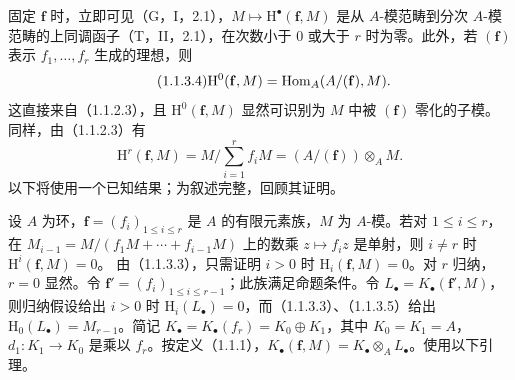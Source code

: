 固定 $\mathbf f$ 时，立即可见（G，I，2.1），$M\mapsto\mathrm H^\bullet(\mathbf f,M)$ 是从 $A$-模范畴到分次 $A$-模范畴的上同调函子（T，II，2.1），在次数小于 $0$ 或大于 $r$ 时为零。此外，若 $(\mathbf f)$ 表示 $f_1,\ldots,f_r$ 生成的理想，则
\begin{equation}\tag{1.1.3.4}
\mathrm H^0(\mathbf f,M)=\operatorname{Hom}_A(A/(\mathbf f),M).
\end{equation}
这直接来自（1.1.2.3），且 $\mathrm H^0(\mathbf f,M)$ 显然可识别为 $M$ 中被 $(\mathbf f)$ 零化的子模。同样，由（1.1.2.3）有
\begin{equation}\tag{1.1.3.5}
\mathrm H^r(\mathbf f,M)=M\Big/\sum_{i=1}^rf_iM=(A/(\mathbf f))\otimes_AM.
\end{equation}
以下将使用一个已知结果；为叙述完整，回顾其证明。

设 $A$ 为环，$\mathbf f=(f_i)_{1\leq i\leq r}$ 是 $A$ 的有限元素族，$M$ 为 $A$-模。若对 $1\leq i\leq r$，在 $M_{i-1}=M/(f_1M+\cdots+f_{i-1}M)$ 上的数乘 $z\mapsto f_iz$ 是单射，则 $i\ne r$ 时 $\mathrm H^i(\mathbf f,M)=0$。
\eproof 由（1.1.3.3），只需证明 $i>0$ 时 $\mathrm H_i(\mathbf f,M)=0$。对 $r$ 归纳，$r=0$ 显然。令 $\mathbf f'=(f_i)_{1\leq i\leq r-1}$；此族满足命题条件。令 $L_\bullet=K_\bullet(\mathbf f',M)$，则归纳假设给出 $i>0$ 时 $\mathrm H_i(L_\bullet)=0$，而（1.1.3.3）、（1.1.3.5）给出 $\mathrm H_0(L_\bullet)=M_{r-1}$。简记 $K_\bullet=K_\bullet(f_r)=K_0\oplus K_1$，其中 $K_0=K_1=A$，$d_1:K_1\to K_0$ 是乘以 $f_r$。按定义（1.1.1），$K_\bullet(\mathbf f,M)=K_\bullet\otimes_AL_\bullet$。使用以下引理。

